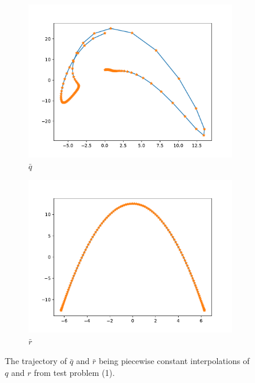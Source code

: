 
\begin{figure}[t]\label{fig:curve_1_pc}
    \begin{subfigure}[t]{0.5\textwidth}\label{fig:curve_1_pc_q}
        \centering
        \includegraphics[width=\linewidth]{figures/curve_1_pc/curve_q_pc.pdf}
        \caption{\(\bar q\)}
    \end{subfigure}
    \begin{subfigure}[t]{0.5\textwidth}\label{fig:curve_1_pc_r}
        \centering
        \includegraphics[width=\linewidth]{figures/curve_1_pc/curve_r_pc.pdf}
        \caption{\(\bar r\)}
    \end{subfigure}
    \caption{The trajectory of \(\bar q\) and \(\bar r\) being piecewise constant interpolations of  \(q\) and  \(r\) from test problem (1).}
\end{figure}


